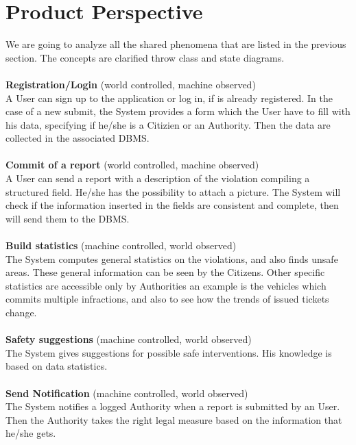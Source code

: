 \documentclass{report}
\begin{document}
\section{Product Perspective}
We are going to analyze all the shared phenomena that are listed in the previous section. The concepts are clarified throw class and state diagrams.\\
\\
\textbf{Registration/Login} (world controlled, machine observed)\\
A User can sign up to the application or log in, if is already registered. 
In the case of a new submit, the System provides a form which the User have to fill with his data, specifying if he/she is 
a Citizien or an Authority. Then the data are collected in the associated DBMS.\\
\\
\textbf{Commit of a report} (world controlled, machine observed)\\
A User can send a report with a description of the violation compiling a structured field. He/she has the possibility to  attach a picture. The System will check if the information inserted in the fields are consistent and complete, then will send them to the
DBMS.\\
\\
\textbf{Build statistics} (machine controlled, world observed)\\
The System computes general statistics on the violations, and also finds unsafe areas. These general information can be seen by the Citizens. Other specific statistics are accessible only by Authorities an example is
the vehicles which commits multiple infractions, and also to see how the trends of issued tickets change. \\
\\
\textbf{Safety suggestions} (machine controlled, world observed)\\
The System gives suggestions for possible safe interventions. His knowledge is based on data statistics.\\
\\
\textbf{Send Notification} (machine controlled, world observed)\\
The System notifies a logged Authority when a report is submitted by an User. 
Then the Authority takes the right legal measure based on the information that he/she gets.
\end{document}
